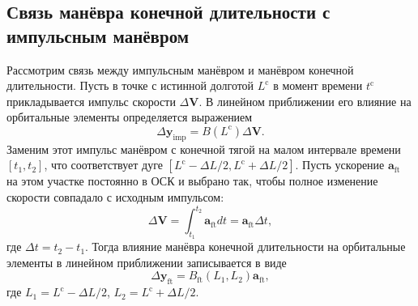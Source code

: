 \subsection{Связь манёвра конечной длительности с импульсным манёвром}

Рассмотрим связь между импульсным манёвром и манёвром конечной длительности. Пусть в точке с истинной долготой $L^\text{c}$ в момент времени $t^\text{c}$ прикладывается импульс скорости $\Delta \mathbf V$. В линейном приближении его влияние на орбитальные элементы определяется выражением
\begin{equation}
    \Delta \mathbf{y}_{\text{imp}} = B(L^\text{c}) \Delta \mathbf V.
\end{equation}
Заменим этот импульс манёвром с конечной тягой на малом интервале времени $[t_1, t_2]$, что соответствует дуге $\left[ L^\text{c} - \Delta L / 2, L^\text{c} + \Delta L / 2 \right]$. Пусть ускорение $\mathbf{a}_{\text{ft}}$ на этом участке постоянно в ОСК и выбрано так, чтобы полное изменение скорости совпадало с исходным импульсом:
\begin{equation}
    \Delta \mathbf V = \int_{t_1}^{t_2} \mathbf{a}_{\text{ft}} dt = 
    \mathbf{a}_{\text{ft}} \Delta t,
\end{equation}
где $\Delta t = t_2 - t_1$. Тогда влияние манёвра конечной длительности на орбитальные элементы в линейном приближении записывается в виде
\begin{equation}
    \Delta \mathbf{y}_{\text{ft}} = B_{\text{ft}} (L_1, L_2) \mathbf{a}_{\text{ft}},
\end{equation}
где $L_1 = L^\text{c} - \Delta L / 2$, $L_2 = L^\text{c} + \Delta L / 2$.

